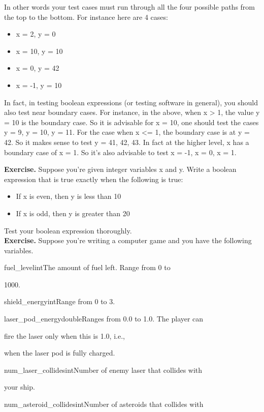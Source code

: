 \documentclass[
]{article}
\providecommand{\tightlist}{%
  \setlength{\itemsep}{0pt}\setlength{\parskip}{0pt}}
\begin{document}
In other words your test cases must run through all the four possible
paths from the top to the bottom. For instance here are 4 cases:

\begin{itemize}
\tightlist
\item
  x = 2, y = 0
\item
  x = 10, y = 10
\item
  x = 0, y = 42
\item
  x = -1, y = 10
\end{itemize}

In fact, in testing boolean expressions (or testing software in
general), you should also test near boundary cases. For instance, in the
above, when x \textgreater{} 1, the value y = 10 is the boundary case.
So it is advisable for x = 10, one should test the cases y = 9, y = 10,
y = 11. For the case when x \textless= 1, the boundary case is at y =
42. So it makes sense to test y = 41, 42, 43. In fact at the higher
level, x has a boundary case of x = 1. So it's also advisable to test x
= -1, x = 0, x = 1.

\textbf{Exercise.} Suppose you're given integer variables x and y. Write
a boolean expression that is true exactly when the following is true:

\begin{itemize}
\tightlist
\item
  If x is even, then y is less than 10
\item
  If x is odd, then y is greater than 20
\end{itemize}

Test your boolean expression thoroughly.\\

\textbf{Exercise.} Suppose you're writing a computer game and you have
the following variables.

fuel\_levelintThe amount of fuel left. Range from 0 to

1000.

shield\_energyintRange from 0 to 3.

laser\_pod\_energydoubleRanges from 0.0 to 1.0. The player can

fire the laser only when this is 1.0, i.e.,

when the laser pod is fully charged.

num\_laser\_collidesintNumber of enemy laser that collides with

your ship.

num\_asteroid\_collidesintNumber of asteroids that collides with
\end{document}
